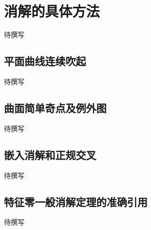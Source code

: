 
% 
% 

\section{消解的具体方法}
\label{g5:sec:2902}

待撰写

\subsection{平面曲线连续吹起}
\label{g5:subsec:2902:01}
待撰写

\subsection{曲面简单奇点及例外图}
\label{g5:subsec:2902:02}
待撰写

\subsection{嵌入消解和正规交叉}
\label{g5:subsec:2902:03}
待撰写

\subsection{特征零一般消解定理的准确引用}
\label{g5:subsec:2902:04}
待撰写
